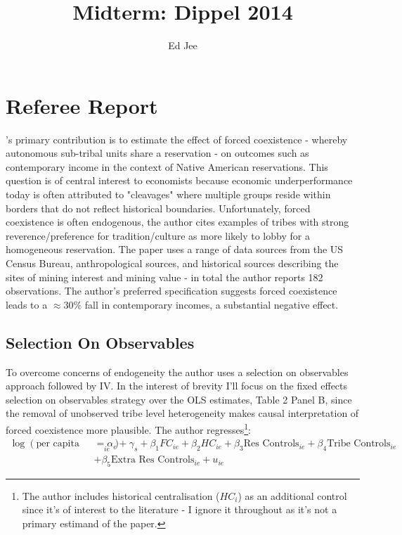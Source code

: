 \documentclass[12pt]{article}
\author{Ed Jee}
\title{Midterm: Dippel 2014}
\begin{document}
\maketitle


\section{Referee Report}

\cite{dippel}'s primary contribution is to estimate the effect of forced coexistence - whereby autonomous sub-tribal units share a 
reservation - on outcomes such as contemporary income in the context of Native American reservations. This question is of central interest to economists because economic underperformance
today is often attributed to "cleavages" where multiple groups reside within borders that do not reflect historical boundaries. Unfortunately, 
forced coexistence is often endogenous, the author cites examples of tribes with strong reverence/preference for tradition/culture as more likely 
to lobby for a homogeneous reservation. The paper uses a range of data sources from the US Census Bureau, anthropological sources, and historical 
sources describing the sites of mining interest and mining value - in total the author reports 182 observations. The author's preferred specification suggests forced coexistence leads to a $\approx 30\%$ fall in contemporary 
incomes, a substantial negative effect.

\subsection{Selection On Observables}
To overcome concerns of endogeneity the author uses a selection on observables approach followed by IV. In the interest of brevity I'll focus 
on the fixed effects selection on observables strategy over the OLS estimates, Table 2 Panel B, since the removal of unobserved tribe level heterogeneity 
makes causal interpretation of forced coexistence more plausible.  The author regresses\footnote{The author includes historical centralisation ($HC_i$) as an additional 
control since it's of interest to the literature - I ignore it throughout as it's not a primary estimand of the paper.}:
\begin{align*}
    \log(\text{per capita income})_{ie} &= \alpha_e + \gamma_s + \beta_1 FC_{ie} + \beta_2 HC_{ie}+ \beta_3 \text{Res Controls}_{ie} + \beta_4 \text{Tribe Controls}_{ie}  \\
    &+ \beta_5 \text{Extra Res Controls}_{ie} + u_{ie} 
\end{align*}
  
\end{document}
